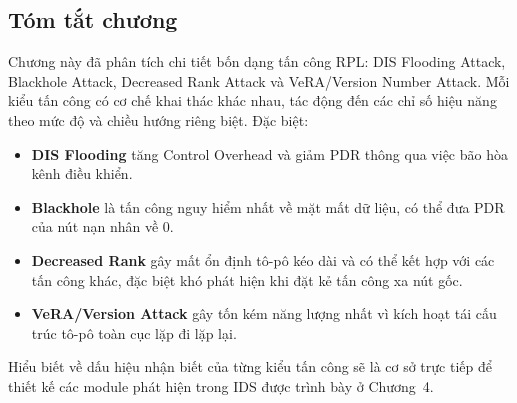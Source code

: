 \subsection{Tóm tắt chương}
\label{subsec:ch3_summary}

Chương này đã phân tích chi tiết bốn dạng tấn công RPL: DIS Flooding
Attack, Blackhole Attack, Decreased Rank Attack và VeRA/Version Number
Attack. Mỗi kiểu tấn công có cơ chế khai thác khác nhau, tác động đến
các chỉ số hiệu năng theo mức độ và chiều hướng riêng biệt. Đặc biệt:

\begin{itemize}
    \item \textbf{DIS Flooding} tăng Control Overhead và giảm PDR thông
          qua việc bão hòa kênh điều khiển.
    \item \textbf{Blackhole} là tấn công nguy hiểm nhất về mặt mất dữ
          liệu, có thể đưa PDR của nút nạn nhân về 0.
    \item \textbf{Decreased Rank} gây mất ổn định tô-pô kéo dài và có
          thể kết hợp với các tấn công khác, đặc biệt khó phát hiện khi
          đặt kẻ tấn công xa nút gốc.
    \item \textbf{VeRA/Version Attack} gây tốn kém năng lượng nhất vì
          kích hoạt tái cấu trúc tô-pô toàn cục lặp đi lặp lại.
\end{itemize}

Hiểu biết về dấu hiệu nhận biết của từng kiểu tấn công sẽ là cơ sở
trực tiếp để thiết kế các module phát hiện trong IDS được trình bày
ở Chương~4.